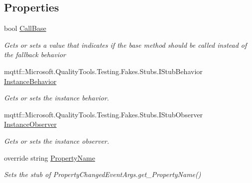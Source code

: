 \subsection*{Properties}
\begin{DoxyCompactItemize}
\item 
bool \hyperlink{class_system_1_1_component_model_1_1_fakes_1_1_stub_property_changed_event_args_adc44168fa8532075a388892037af3687}{Call\-Base}
\begin{DoxyCompactList}\small\item\em Gets or sets a value that indicates if the base method should be called instead of the fallback behavior\end{DoxyCompactList}\item 
mqttf\-::\-Microsoft.\-Quality\-Tools.\-Testing.\-Fakes.\-Stubs.\-I\-Stub\-Behavior \hyperlink{class_system_1_1_component_model_1_1_fakes_1_1_stub_property_changed_event_args_a0d7278c94a18caf144d836bf29dee9cf}{Instance\-Behavior}
\begin{DoxyCompactList}\small\item\em Gets or sets the instance behavior.\end{DoxyCompactList}\item 
mqttf\-::\-Microsoft.\-Quality\-Tools.\-Testing.\-Fakes.\-Stubs.\-I\-Stub\-Observer \hyperlink{class_system_1_1_component_model_1_1_fakes_1_1_stub_property_changed_event_args_a347ab7d4afc5234b2b927c8b01477ee5}{Instance\-Observer}
\begin{DoxyCompactList}\small\item\em Gets or sets the instance observer.\end{DoxyCompactList}\item 
override string \hyperlink{class_system_1_1_component_model_1_1_fakes_1_1_stub_property_changed_event_args_aa0d1ae4e4b40a867de20e72bb428e58f}{Property\-Name}
\begin{DoxyCompactList}\small\item\em Sets the stub of Property\-Changed\-Event\-Args.\-get\-\_\-\-Property\-Name()\end{DoxyCompactList}\end{DoxyCompactItemize}


